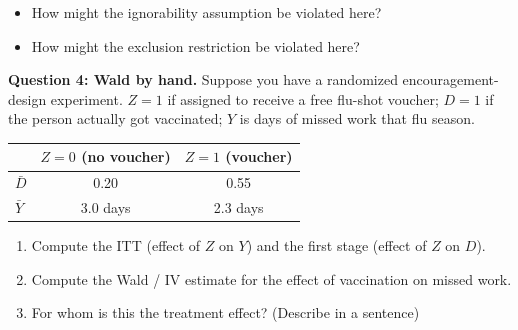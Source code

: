 \documentclass[11pt]{article}
\begin{document}
\begin{itemize}
\item How might the ignorability assumption be violated here?
\vspace{2.5cm}
\item How might the exclusion restriction be violated here?
\vspace{2.5cm}
\end{itemize}

\noindent\textbf{Question 4: Wald by hand.}  Suppose you have a randomized encouragement-design experiment.  $Z=1$ if assigned to receive a free flu-shot voucher; $D=1$ if the person actually got vaccinated; $Y$ is days of missed work that flu season.

\medskip
\begin{center}
\begin{tabular}{lcc}
\toprule
            & \textbf{$Z=0$ (no voucher)} & \textbf{$Z=1$ (voucher)} \\
\midrule
$\bar D$    &   0.20    &   0.55    \\
$\bar Y$    &   3.0 days  &  2.3 days \\
\bottomrule
\end{tabular}
\end{center}
\medskip

\begin{enumerate}[label=(\alph*), itemsep=0.4em]
\item Compute the ITT (effect of $Z$ on $Y$) and the first stage (effect of $Z$ on $D$).

\vspace{2.5cm}

\item Compute the Wald / IV estimate for the effect of vaccination on missed work.

\vspace{2.5cm}

\item For whom is this the treatment effect? (Describe in a sentence)

\vspace{3cm}
\end{enumerate}


\end{document}
